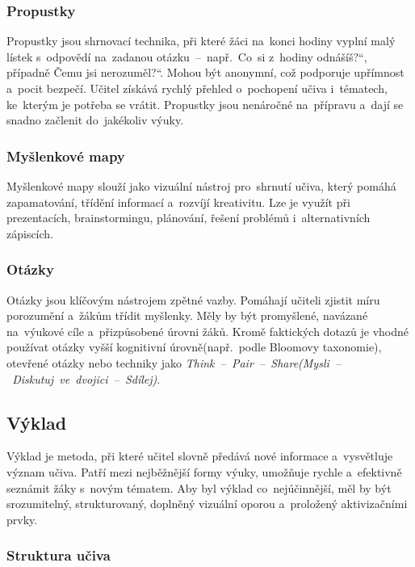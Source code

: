\documentclass[male,czech,api_bc]{kitheses}
\begin{document}
\subsubsection{Propustky}

Propustky jsou shrnovací technika, při které žáci na~konci hodiny vyplní malý lístek s~odpovědí na~zadanou otázku~--~např.~\quotedblbase Co~si z~hodiny odnášíš?“, případně \quotedblbase Čemu jsi nerozuměl?“. Mohou být anonymní, což podporuje upřímnost a~pocit bezpečí. Učitel získává rychlý přehled o~pochopení učiva i~tématech, ke~kterým je potřeba se vrátit. Propustky jsou nenáročné na~přípravu a~dají se snadno začlenit do~jakékoliv výuky.

\subsubsection{Myšlenkové mapy}

Myšlenkové mapy slouží jako vizuální nástroj pro~shrnutí učiva, který pomáhá zapamatování, třídění informací a~rozvíjí kreativitu. Lze je využít při prezentacích, brainstormingu, plánování, řešení problémů i~alternativních zápiscích.

\subsubsection{Otázky}

Otázky jsou klíčovým nástrojem zpětné vazby. Pomáhají učiteli zjistit míru porozumění a~žákům třídit myšlenky. Měly by být promyšlené, navázané na~výukové cíle a~přizpůsobené úrovni žáků. Kromě faktických dotazů je vhodné používat otázky vyšší kognitivní úrovně\break(např.~podle Bloomovy taxonomie), otevřené otázky nebo techniky jako \textit{Think~--~Pair~--~Share\break(Mysli~--~Diskutuj~ve~dvojici~--~Sdílej)}.

\subsection{Výklad}

Výklad je metoda, při které učitel slovně předává nové informace a~vysvětluje význam učiva. Patří mezi nejběžnější formy výuky, umožňuje rychle a~efektivně seznámit žáky s~novým tématem. Aby byl výklad co~nejúčinnější, měl by být srozumitelný, strukturovaný, doplněný vizuální oporou a~proložený aktivizačními prvky.

\subsubsection{Struktura učiva}
\end{document}

